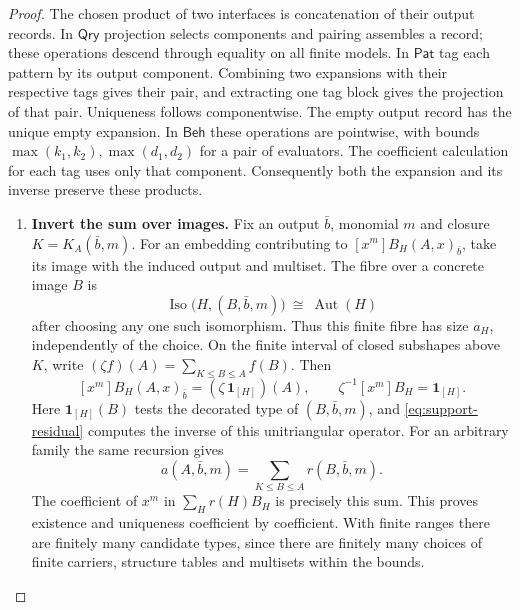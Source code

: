 \documentclass[11pt,a4paper]{article}
\theoremstyle{definition}
\theoremstyle{remark}\newaliascnt{remark}{theorem}
\numberwithin{equation}{section}
\begin{document}
\begin{proof}

The chosen product of two interfaces is concatenation of their output records. In \(\mathsf{Qry}\) projection selects components and pairing assembles a record; these operations descend through equality on all finite models. In \(\mathsf{Pat}\) tag each pattern by its output component. Combining two expansions with their respective tags gives their pair, and extracting one tag block gives the projection of that pair. Uniqueness follows componentwise. The empty output record has the unique empty expansion. In \(\mathsf{Beh}\) these operations are pointwise, with bounds \(\max(k_1,k_2),\max(d_1,d_2)\) for a pair of evaluators. The coefficient calculation for each tag uses only that component. Consequently both the expansion and its inverse preserve these products.

\begin{enumerate}[titledsteps]
    \item \textbf{Invert the sum over images.} Fix an output \(\bar b\), monomial \(m\) and closure \(K=K_A(\bar b,m)\). For an embedding contributing to \([x^m]B_H(A,x)_{\bar b}\), take its image with the induced output and multiset. The fibre over a concrete image \(B\) is
\[
 \operatorname{Iso}\bigl(H,(B,\bar b,m)\bigr)
 \ \cong\ \operatorname{Aut}(H)
\]
after choosing any one such isomorphism. Thus this finite fibre has size \(a_H\), independently of the choice. On the finite interval of closed subshapes above \(K\), write \((\zeta f)(A)=\sum_{K\le B\le A}f(B)\). Then
\[
 [x^m]B_H(A,x)_{\bar b}
   =(\zeta\,\mathbf1_{[H]})(A),\qquad
 \zeta^{-1}[x^m]B_H=\mathbf1_{[H]}.
\]
Here \(\mathbf1_{[H]}(B)\) tests the decorated type of \((B,\bar b,m)\), and \eqref{eq:support-residual} computes the inverse of this unitriangular operator. For an arbitrary family the same recursion gives
\[
 a(A,\bar b,m)=\sum_{K\le B\le A}r(B,\bar b,m).
\]
The coefficient of $x^m$ in $\sum_H r(H)B_H$ is precisely this sum. This proves existence and uniqueness coefficient by coefficient. With finite ranges there are finitely many candidate types, since there are finitely many choices of finite carriers, structure tables and multisets within the bounds.



\end{enumerate}
\end{proof}
\end{document}
